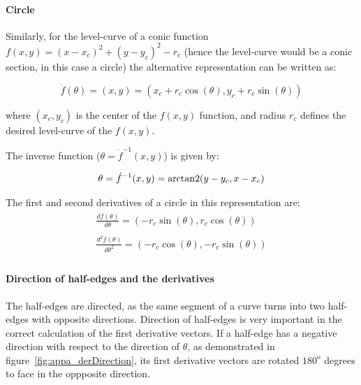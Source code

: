 \paragraph{Circle}
Similarly, for the level-curve of a conic function $f(x,y)=(x-x_c)^2+(y-y_c)^2-r_c$ (hence the level-curve would be a conic section, in this case a circle) the alternative representation can be written as:

\[
\dot{f}(\theta) = (x,y) = \left( x_c + r_c \cos(\theta), y_c + r_c \sin(\theta) \right)
\]

where $(x_c,y_c)$ is the center of the $f(x,y)$ function, and radius $r_c$ defines the desired level-curve of the $f(x,y)$.\bigskip

The inverse function ($\theta = \dot{f}^{-1}(x,y)$) is given by:

\[
\theta = \dot{f}^{-1}(x,y) = \operatorname{arctan2} (y - y_c, x - x_c)
\]

The first and second derivatives of a circle in this representation are:
\[
\begin{array}{l}
  \frac{d\dot{f}(\theta)}{d\theta} = \left( -r_c \sin(\theta), r_c \cos(\theta) \right)\\
  \quad\\
  \frac{d^2\dot{f}(\theta)}{d\theta^2} = \left( -r_c \cos(\theta), -r_c \sin(\theta) \right)\\
\end{array}
\]

\paragraph{Direction of half-edges and the derivatives}
The half-edges are directed, as the same segment of a curve turns into two half-edges with opposite directions.
Direction of half-edges is very important in the correct calculation of the first derivative vectors.
If a half-edge has a negative direction with respect to the direction of $\theta$, as demonstrated in figure~\ref{fig:appa_derDirection}, its first derivative vectors are rotated $180^o$ degrees to face in the oppposite direction.



